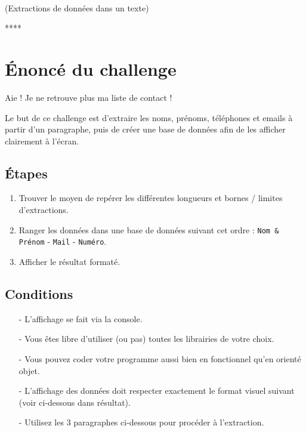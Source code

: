 \documentclass[a4paper,12pt]{article}
\title{\fbox{Challenge du 15 octobre 2023}}
\author{\textbf{@bucdany}}
\date{4 novembre 2023}
\begin{document}
\maketitle
\begin{center}
\textbf{{\LARGE \color{blue}{La liste de contacts}}} \\
(Extractions de données dans un texte)
\medskip

****
\end{center}
\bigskip

\section{Énoncé du challenge}
Aie ! Je ne retrouve plus ma liste de contact !
\medskip

Le but de ce challenge est d'extraire les noms, prénoms, téléphones et emails à partir d'un paragraphe, puis de créer une base de données afin de les afficher clairement à l'écran.
\medskip

\subsection*{Étapes}
\begin{enumerate}
	\item Trouver le moyen de repérer les différentes longueurs et bornes / limites d'extractions.
	\item Ranger les données dans une base de données suivant cet ordre : \texttt{Nom \& Prénom} - \texttt{Mail} - \texttt{Numéro}.
	\item Afficher le résultat formaté.
\end{enumerate}
\medskip

\subsection*{Conditions}
\begin{itemize}
	\item[-] L'affichage se fait via la console.
	\item[-] Vous êtes libre d'utiliser (ou pas) toutes les librairies de votre choix.
	\item[-] Vous pouvez coder votre programme aussi bien en fonctionnel qu'en orienté objet.
	\item[-] L'affichage des données doit respecter exactement le format visuel suivant (voir ci-dessous dans résultat).
	\item[-] Utilisez les 3 paragraphes ci-dessous pour procéder à l'extraction.
\end{itemize}
\medskip
\end{document}
